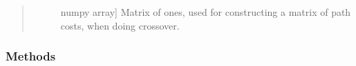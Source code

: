 \documentclass[letterpaper,10pt,english,openany,oneside]{sphinxmanual}
\begin{document}
\begin{fulllineitems}
\begin{quote}
\begin{description}
\begin{description}
\item[{}] \leavevmode{[}numpy array{]}
Matrix of ones, used for constructing a matrix of path costs, when
doing crossover.

\end{description}

\end{description}\end{quote}
\subsubsection*{Methods}


\begin{savenotes}\sphinxatlongtablestart\begin{longtable}{}
\hline

\endfirsthead

%
{}\\
\hline

\endhead

\hline
{}\\
\endfoot

\endlastfoot


\end{longtable}
\end{savenotes}
\end{fulllineitems}
\end{document}
